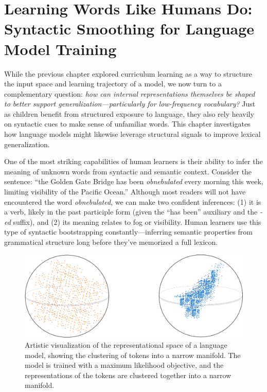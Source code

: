 \chapter{Learning Words Like Humans Do: Syntactic Smoothing for Language Model Training}

While the previous chapter explored curriculum learning as a way to structure the input space and learning trajectory of a model, we now turn to a complementary question: \emph{how can internal representations themselves be shaped to better support generalization—particularly for low-frequency vocabulary?} Just as children benefit from structured exposure to language, they also rely heavily on syntactic cues to make sense of unfamiliar words. This chapter investigates how language models might likewise leverage structural signals to improve lexical generalization.

One of the most striking capabilities of human learners is their ability to infer the meaning of unknown words from syntactic and semantic context. Consider the sentence: ``the Golden Gate Bridge has been \emph{obnebulated} every morning this week, limiting visibility of the Pacific Ocean.'' Although most readers will not have encountered the word \textit{obnebulated}, we can make two confident inferences: (1) it is a verb, likely in the past participle form (given the ``has been'' auxiliary and the \textit{-ed} suffix), and (2) its meaning relates to fog or visibility. Human learners use this type of syntactic bootstrapping constantly—inferring semantic properties from grammatical structure long before they've memorized a full lexicon.

\begin{figure}[ht!]
    \centering
    \includegraphics[width=0.8\linewidth]{chapters/syntatic-smoothing/figures/anisotropy_visualization.pdf}
    \caption{Artistic visualization of the representational space of a language model, showing the clustering of tokens into a narrow manifold. The model is trained with a maximum likelihood objective, and the representations of the tokens are clustered together into a narrow manifold.}
    \label{fig:anisotropy_visualization}
\end{figure}

